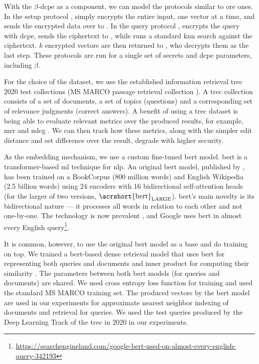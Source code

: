			With the $\beta$-\acrshort{dcpe} as a component, we can model the protocols similar to \acrshort{ore} ones.
			In the setup protocol \protocolSetup{}, \user{} simply encrypts the entire input, one vector at a time, and sends the encrypted data over to \server{}.
			In the query protocol \protocolQuery{}, \user{} encrypts the query with \acrshort{dcpe}, sends the ciphertext to \server{}, while \server{} runs a standard \acrshort{knn} search against the ciphertext.
			$k$ encrypted vectors are then returned to \user{}, who decrypts them as the last step.
			These protocols are run for a single set of secrets and \acrshort{dcpe} parameters, including $\beta$.

			For the choice of the dataset, we use the established information retrieval \acrshort{trec} 2020 test collections (MS MARCO passage retrieval collection \cite{ms-marco}).
			A \acrshort{trec} collection consists of a set of documents, a set of topics (questions) and a corresponding set of relevance judgments (correct answers).
			A benefit of using a \acrshort{trec} dataset is being able to evaluate relevant metrics over the produced results, for example, \acrshort{mrr} \cite{mrr} and \acrshort{ndcg} \cite{dcg}.
			We can then track how these metrics, along with the simpler edit distance and set difference over the result, degrade with higher security.

			As the embedding mechanism, we use a custom fine-tuned \acrshort{bert} model.
			\acrfull{bert} is a transformer-based \acrshort{ml} technique for \acrlong{nlp}.
			An original \acrshort{bert} model, published by \textcite{bert}, has been trained on a BookCorpus \cite{bookcorpus} (800 million words) and English Wikipedia (2.5 billion words) using 24 encoders with 16 bidirectional self-attention heads (for the larger of two versions, $\text{\acrshort{bert}}_\text{LARGE}$).
			\acrshort{bert}'s main novelty is its bidirectional nature --- it processes all words in relation to each other and not one-by-one.
			The technology is now prevalent \cite{bert-is-prevalent}, and Google uses \acrshort{bert} in almost every English query\footnote{
				\url{https://searchengineland.com/google-bert-used-on-almost-every-english-query-342193}
			}.

			It is common, however, to use the original \acrshort{bert} model as a base and do training on top.
			We trained a \acrshort{bert}-based dense retrieval model that uses \acrshort{bert} for representing both queries and documents and inner product for computing their similarity \cite{hamed-custom-bert}.
			The parameters between both \acrshort{bert} models (for queries and documents) are shared.
			We used cross entropy loss function for training and used the standard MS MARCO \cite{ms-marco} training set.
			The produced vectors by the \acrshort{bert} model are used in our experiments for approximate nearest neighbor indexing of documents and retrieval for queries.
			We used the test queries produced by the Deep Learning Track of the \acrfull{trec} in 2020 in our experiments.

